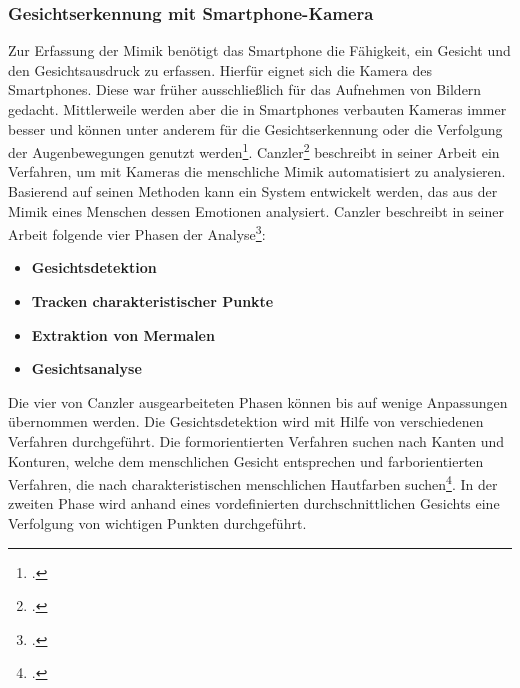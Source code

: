 \subsubsection{Gesichtserkennung mit Smartphone-Kamera}
Zur Erfassung der Mimik benötigt das Smartphone die Fähigkeit, ein Gesicht und den Gesichtsausdruck zu erfassen. Hierfür eignet sich  die Kamera des Smartphones. Diese war früher ausschließlich für das Aufnehmen von Bildern gedacht. Mittlerweile werden aber die in Smartphones verbauten Kameras immer besser und können unter anderem für die Gesichtserkennung oder die Verfolgung der Augenbewegungen genutzt werden\footcite[Vgl. ][Seite 2 Kamera Abs. 1+2]{Bie14}.\newline %
Canzler\footcite{Can01} beschreibt in seiner Arbeit ein Verfahren, um mit Kameras die menschliche Mimik automatisiert zu analysieren. Basierend auf seinen Methoden kann ein System entwickelt werden, das aus der Mimik eines Menschen dessen Emotionen analysiert. Canzler beschreibt in seiner Arbeit folgende vier Phasen der Analyse\footcite[Vgl. ][S.2-5]{Can01}:
\begin{itemize}
	\item[1.] \textbf{Gesichtsdetektion}
	\item[2.] \textbf{Tracken charakteristischer Punkte}
	\item[3.] \textbf{Extraktion von Mermalen}%
	\item[4.] \textbf{Gesichtsanalyse}
\end{itemize}
Die vier von Canzler ausgearbeiteten Phasen können bis auf wenige Anpassungen übernommen werden. Die Gesichtsdetektion wird mit Hilfe von verschiedenen Verfahren durchgeführt. Die formorientierten Verfahren suchen nach Kanten und Konturen, welche dem menschlichen Gesicht entsprechen und farborientierten Verfahren, die nach charakteristischen menschlichen Hautfarben suchen\footcite[Vgl. ][S.2 Z.14ff]{Can01}. In der zweiten Phase wird anhand eines vordefinierten durchschnittlichen Gesichts eine Verfolgung von wichtigen Punkten durchgeführt. %
